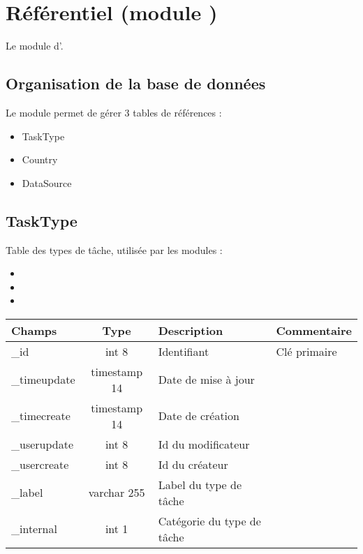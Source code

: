 

\clearpage
\section{Référentiel (module \adminref)}

Le module \adminref d'\obm.

\subsection{Organisation de la base de données}

Le module \adminref permet de gérer 3 tables de références :
\begin{itemize}
 \item TaskType
 \item Country
 \item DataSource
\end{itemize}

\subsection{TaskType}

Table des types de tâche, utilisée par les modules :
\begin{itemize}
 \item \deal
 \item \project
 \item \timemanager
\end{itemize}
\vspace{0.4cm}

\begin{tabular}{|p{3cm}|c|p{5.4cm}|p{2.6cm}|}
\hline
\textbf{Champs} & \textbf{Type} & \textbf{Description} & \textbf{Commentaire} \\
\hline
\_id & int 8 & Identifiant & Clé primaire \\
\hline
\_timeupdate & timestamp 14 & Date de mise à jour & \\
\hline
\_timecreate & timestamp 14 & Date de création & \\
\hline
\_userupdate & int 8 & Id du modificateur & \\
\hline
\_usercreate & int 8 & Id du créateur & \\
\hline
\_label & varchar 255 & Label du type de tâche & \\
\hline
\_internal & int 1 & Catégorie du type de tâche & \\
\hline
\end{tabular}


